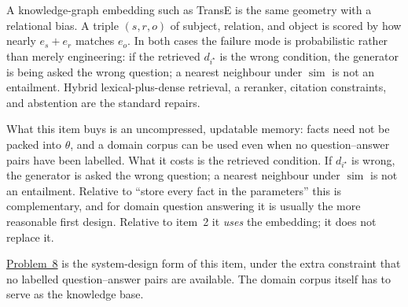 \documentclass[11pt,a4paper]{article}
\newcommand{\jump}[2]{\hyperref[#1]{#2}}
\theoremstyle{definition}
\begin{document}
A knowledge-graph embedding such as TransE is the same geometry with a relational bias. A triple \((s,r,o)\) of subject, relation, and object is scored by how nearly \(e_s+e_r\) matches \(e_o\). In both cases the failure mode is probabilistic rather than merely engineering: if the retrieved \(d_{i^\star}\) is the wrong condition, the generator is being asked the wrong question; a nearest neighbour under \(\operatorname{sim}\) is not an entailment. Hybrid lexical-plus-dense retrieval, a reranker, citation constraints, and abstention are the standard repairs.

What this item buys is an uncompressed, updatable memory: facts need not be packed into \(\theta\), and a domain corpus can be used even when no question--answer pairs have been labelled. What it costs is the retrieved condition. If \(d_{i^\star}\) is wrong, the generator is asked the wrong question; a nearest neighbour under \(\operatorname{sim}\) is not an entailment. Relative to ``store every fact in the parameters'' this is complementary, and for domain question answering it is usually the more reasonable first design. Relative to item~2 it \emph{uses} the embedding; it does not replace it.

\jump{prob:spr2025-nlp-8}{Problem~8} is the system-design form of this item, under the extra constraint that no labelled question--answer pairs are available. The domain corpus itself has to serve as the knowledge base.

\begin{center}
\end{center}
\end{document}

